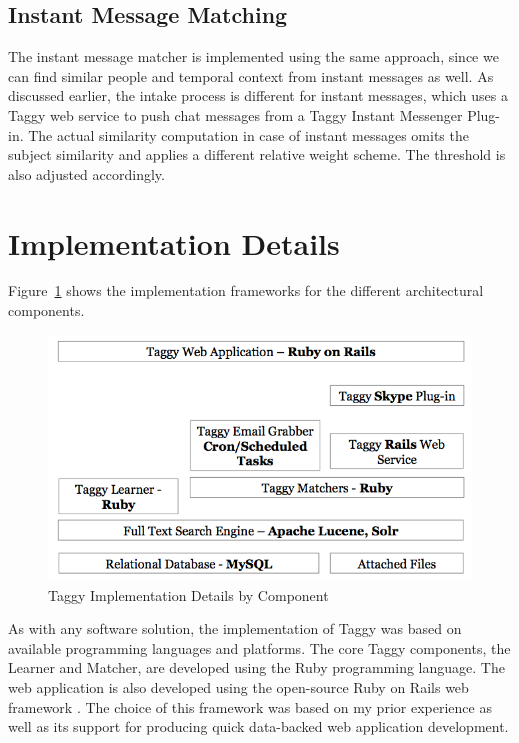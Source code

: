 \subsection{Instant Message Matching}
The instant message matcher is implemented using the same approach, since we can find similar people and temporal context from instant messages as well. As discussed earlier, the intake process is different for instant messages, which uses a Taggy web service to push chat messages from a Taggy Instant Messenger Plug-in. The actual similarity computation in case of instant messages omits the subject similarity and applies a different relative weight scheme. The threshold is also adjusted accordingly.

\section{Implementation Details}
Figure~\ref{fig:implementation} shows the implementation frameworks for the different architectural components.


\begin{figure}[bt]
	\centering
	\includegraphics[width=\textwidth]{Implementation.png}
    \caption{Taggy Implementation Details by Component}
	\label{fig:implementation}
\end{figure}



As with any software solution, the implementation of Taggy was based on available programming languages and platforms. The core Taggy components, the Learner and Matcher, are developed using the Ruby programming language\cite{ruby}. The web application is also developed using the open-source Ruby on Rails web framework \cite{ruby_on_rails}. The choice of this framework was based on my prior experience as well as its support for producing quick data-backed web application development.


